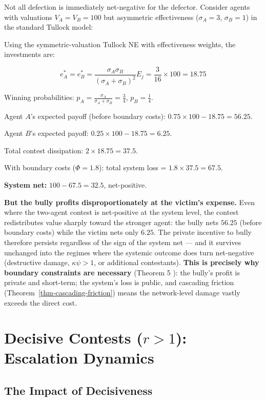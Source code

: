 \documentclass[11pt]{article}
\theoremstyle{plain}
\theoremstyle{definition}
\theoremstyle{remark}
\let\origsection\section
\renewcommand{\section}{\needspace{12\baselineskip}\origsection}
\let\origsubsection\subsection
\renewcommand{\subsection}{\needspace{7\baselineskip}\origsubsection}
\begin{document}
Not all defection is immediately net-negative for the defector. Consider
agents with valuations \(V_A = V_B = 100\) but asymmetric effectiveness
(\(\sigma_A = 3\), \(\sigma_B = 1\)) in the standard Tullock model:

Using the symmetric-valuation Tullock NE with effectiveness weights, the
investments are:

\[e_A^* = e_B^* = \frac{\sigma_A \sigma_B}{(\sigma_A + \sigma_B)^2} E_j = \frac{3}{16} \times 100 = 18.75\]

Winning probabilities:
\(p_A = \frac{\sigma_A}{\sigma_A + \sigma_B} = \frac{3}{4}\),
\(p_B = \frac{1}{4}\).

Agent \(A\)'s expected payoff (before boundary costs):
\(0.75 \times 100 - 18.75 = 56.25\).

Agent \(B\)'s expected payoff: \(0.25 \times 100 - 18.75 = 6.25\).

Total contest dissipation: \(2 \times 18.75 = 37.5\).

With boundary costs (\(\Phi = 1.8\)): total system loss =
\(1.8 \times 37.5 = 67.5\).

\textbf{System net:} \(100 - 67.5 = 32.5\), net-positive.

\textbf{But the bully profits disproportionately at the victim's
expense.} Even where the two-agent contest is net-positive at the system
level, the contest redistributes value sharply toward the stronger
agent: the bully nets \(56.25\) (before boundary costs) while the victim
nets only \(6.25\). The private incentive to bully therefore persists
regardless of the sign of the system net --- and it survives unchanged
into the regimes where the systemic outcome does turn net-negative
(destructive damage, \(\kappa\psi > 1\), or additional contestants).
\textbf{This is precisely why boundary constraints are necessary}
(Theorem 5 \citep{TC-I}): the bully's profit is private and short-term;
the system's loss is public, and cascading friction
(Theorem~\ref{thm-cascading-friction}) means the network-level damage
vastly exceeds the direct cost.

\section{\texorpdfstring{Decisive Contests (\(r > 1\)): Escalation
Dynamics}{Decisive Contests (r \textgreater{} 1): Escalation Dynamics}}\label{decisive-contests-escalation-dynamics}

\subsection{The Impact of
Decisiveness}\label{the-impact-of-decisiveness}
\end{document}

